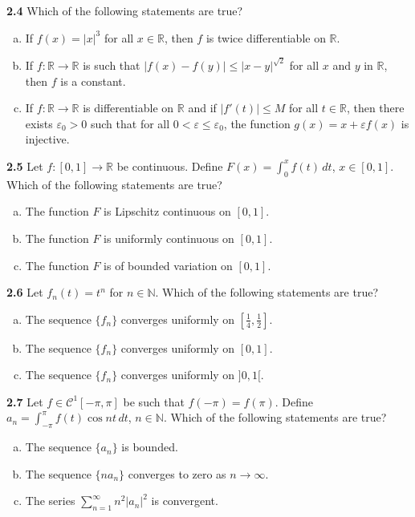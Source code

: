 \documentclass[11pt,a4paper]{article}
\newcommand{\N}{\mathbb{N}}
\newcommand{\R}{\mathbb{R}}
\newcommand{\qitem}[1]{\par\medskip\noindent\textbf{#1}\hspace{0.5em}}
\begin{document}
\qitem{2.4} Which of the following statements are true?
\begin{enumerate}[a.]
  \item If $f(x) = |x|^3$ for all $x \in \R$, then $f$ is twice differentiable on $\R$.
  \item If $f : \R \to \R$ is such that $|f(x) - f(y)| \le |x - y|^{\sqrt{2}}$ for all $x$ and $y$ in $\R$, then $f$ is a constant.
  \item If $f : \R \to \R$ is differentiable on $\R$ and if $|f'(t)| \le M$ for all $t \in \R$, then there exists $\varepsilon_0 > 0$ such that for all $0 < \varepsilon \le \varepsilon_0$, the function $g(x) = x + \varepsilon f(x)$ is injective.
\end{enumerate}

\qitem{2.5} Let $f : [0, 1] \to \R$ be continuous. Define $F(x) = \int_0^x f(t)\,dt$, $x \in [0, 1]$. Which of the following statements are true?
\begin{enumerate}[a.]
  \item The function $F$ is Lipschitz continuous on $[0, 1]$.
  \item The function $F$ is uniformly continuous on $[0, 1]$.
  \item The function $F$ is of bounded variation on $[0, 1]$.
\end{enumerate}

\qitem{2.6} Let $f_n(t) = t^n$ for $n \in \N$. Which of the following statements are true?
\begin{enumerate}[a.]
  \item The sequence $\{f_n\}$ converges uniformly on $\left[\frac{1}{4}, \frac{1}{2}\right]$.
  \item The sequence $\{f_n\}$ converges uniformly on $[0, 1]$.
  \item The sequence $\{f_n\}$ converges uniformly on $]0, 1[$.
\end{enumerate}

\qitem{2.7} Let $f \in \mathcal{C}^1[-\pi, \pi]$ be such that $f(-\pi) = f(\pi)$. Define $a_n = \int_{-\pi}^{\pi} f(t)\cos nt\,dt$, $n \in \N$. Which of the following statements are true?
\begin{enumerate}[a.]
  \item The sequence $\{a_n\}$ is bounded.
  \item The sequence $\{na_n\}$ converges to zero as $n \to \infty$.
  \item The series $\sum_{n=1}^{\infty} n^2 |a_n|^2$ is convergent.
\end{enumerate}
\end{document}
